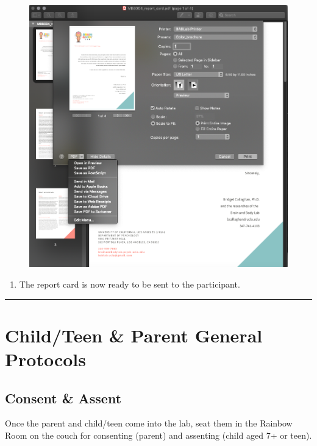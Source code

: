 \documentclass[]{book}
\providecommand{\tightlist}{%
  \setlength{\itemsep}{0pt}\setlength{\parskip}{0pt}}
\begin{document}
\begin{figure}
\centering
\includegraphics{images/final_checklist/report_cards/7.png}
\caption{}
\end{figure}

\begin{enumerate}
\def\labelenumi{\arabic{enumi}.}
\setcounter{enumi}{7}
\tightlist
\item
  The report card is now ready to be sent to the participant.
\end{enumerate}

\begin{center}\rule{0.5\linewidth}{0.5pt}\end{center}

\hypertarget{childteen-parent-general-protocols}{%
\section{Child/Teen \& Parent General Protocols}\label{childteen-parent-general-protocols}}

\hypertarget{consent-assent}{%
\subsection{Consent \& Assent}\label{consent-assent}}

Once the parent and child/teen come into the lab, seat them in the Rainbow Room on the couch for consenting (parent) and assenting (child aged 7+ or teen).
\end{document}
